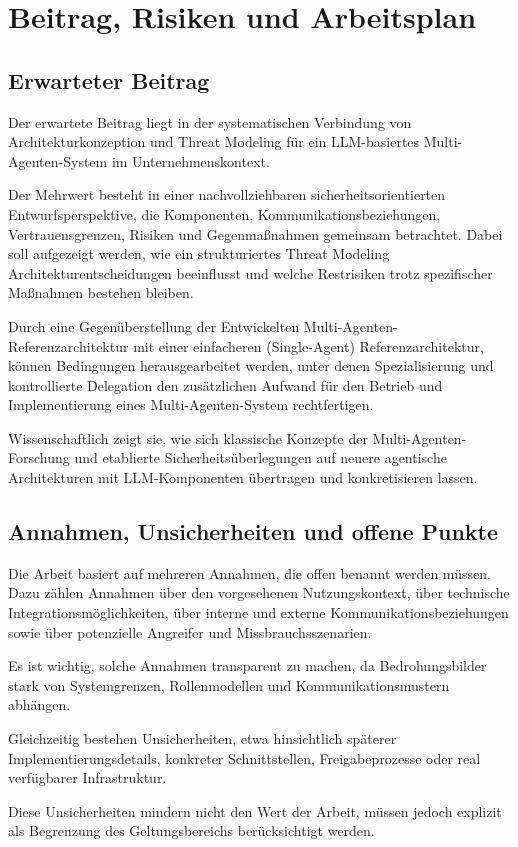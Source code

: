 %

\section{Beitrag, Risiken und Arbeitsplan}

\subsection{Erwarteter Beitrag}

Der erwartete Beitrag liegt in der systematischen Verbindung von Architekturkonzeption und Threat Modeling für ein LLM-basiertes Multi-Agenten-System im Unternehmenskontext.

Der Mehrwert besteht in einer nachvollziehbaren sicherheitsorientierten Entwurfsperspektive, die Komponenten, Kommunikationsbeziehungen, Vertrauensgrenzen, Risiken und Gegenmaßnahmen gemeinsam betrachtet. Dabei soll aufgezeigt werden, wie ein strukturiertes Threat Modeling Architekturentscheidungen beeinflusst und welche Restrisiken trotz spezifischer Maßnahmen bestehen bleiben.

Durch eine Gegenüberstellung der Entwickelten Multi-Agenten-Referenzarchitektur mit einer einfacheren (Single-Agent) Referenzarchitektur, können Bedingungen herausgearbeitet werden, unter denen Spezialisierung und kontrollierte Delegation den zusätzlichen Aufwand für den Betrieb und Implementierung eines Multi-Agenten-System rechtfertigen.

Wissenschaftlich zeigt sie, wie sich klassische Konzepte der Multi-Agenten-Forschung und etablierte Sicherheitsüberlegungen auf neuere agentische Architekturen mit LLM-Komponenten übertragen und konkretisieren lassen.

\subsection{Annahmen, Unsicherheiten und offene Punkte}

Die Arbeit basiert auf mehreren Annahmen, die offen benannt werden müssen. Dazu zählen Annahmen über den vorgesehenen Nutzungskontext, über technische Integrationsmöglichkeiten, über interne und externe Kommunikationsbeziehungen sowie über potenzielle Angreifer und Missbrauchsszenarien.

Es ist wichtig, solche Annahmen transparent zu machen, da Bedrohungsbilder stark von Systemgrenzen, Rollenmodellen und Kommunikationsmustern abhängen.

Gleichzeitig bestehen Unsicherheiten, etwa hinsichtlich späterer Implementierungsdetails, konkreter Schnittstellen, Freigabeprozesse oder real verfügbarer Infrastruktur.

Diese Unsicherheiten mindern nicht den Wert der Arbeit, müssen jedoch explizit als Begrenzung des Geltungsbereichs berücksichtigt werden.